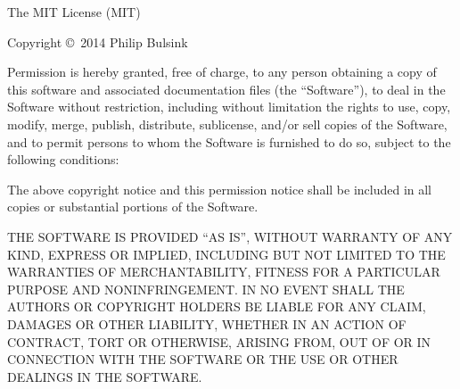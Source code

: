 The MIT License (MIT)

Copyright \copyright~2014 Philip Bulsink

Permission is hereby granted, free of charge, to any person obtaining a
copy of this software and associated documentation files (the
``Software''), to deal in the Software without restriction, including
without limitation the rights to use, copy, modify, merge, publish,
distribute, sublicense, and/or sell copies of the Software, and to
permit persons to whom the Software is furnished to do so, subject to
the following conditions:

The above copyright notice and this permission notice shall be included
in all copies or substantial portions of the Software.

THE SOFTWARE IS PROVIDED ``AS IS'', WITHOUT WARRANTY OF ANY KIND,
EXPRESS OR IMPLIED, INCLUDING BUT NOT LIMITED TO THE WARRANTIES OF
MERCHANTABILITY, FITNESS FOR A PARTICULAR PURPOSE AND NONINFRINGEMENT.
IN NO EVENT SHALL THE AUTHORS OR COPYRIGHT HOLDERS BE LIABLE FOR ANY
CLAIM, DAMAGES OR OTHER LIABILITY, WHETHER IN AN ACTION OF CONTRACT,
TORT OR OTHERWISE, ARISING FROM, OUT OF OR IN CONNECTION WITH THE
SOFTWARE OR THE USE OR OTHER DEALINGS IN THE SOFTWARE.

